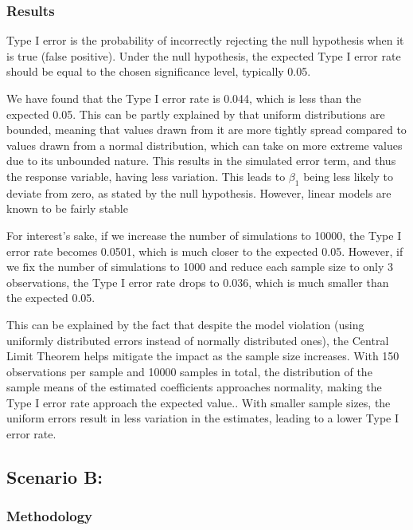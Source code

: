 \documentclass[
]{article}
\begin{document}
\hypertarget{results}{%
\subsubsection{Results}\label{results}}

Type I error is the probability of incorrectly rejecting the null
hypothesis when it is true (false positive). Under the null hypothesis,
the expected Type I error rate should be equal to the chosen
significance level, typically 0.05.

We have found that the Type I error rate is 0.044, which is less than
the expected 0.05. This can be partly explained by that uniform
distributions are bounded, meaning that values drawn from it are more
tightly spread compared to values drawn from a normal distribution,
which can take on more extreme values due to its unbounded nature. This
results in the simulated error term, and thus the response variable,
having less variation. This leads to \(\beta_1\) being less likely to
deviate from zero, as stated by the null hypothesis. However, linear
models are known to be fairly stable

For interest's sake, if we increase the number of simulations to 10000,
the Type I error rate becomes 0.0501, which is much closer to the
expected 0.05. However, if we fix the number of simulations to 1000 and
reduce each sample size to only 3 observations, the Type I error rate
drops to 0.036, which is much smaller than the expected 0.05.

This can be explained by the fact that despite the model violation
(using uniformly distributed errors instead of normally distributed
ones), the Central Limit Theorem helps mitigate the impact as the sample
size increases. With 150 observations per sample and 10000 samples in
total, the distribution of the sample means of the estimated
coefficients approaches normality, making the Type I error rate approach
the expected value.. With smaller sample sizes, the uniform errors
result in less variation in the estimates, leading to a lower Type I
error rate.

\hypertarget{scenario-b}{%
\subsection{Scenario B:}\label{scenario-b}}

\hypertarget{methodology-1}{%
\subsubsection{Methodology}\label{methodology-1}}
\end{document}
